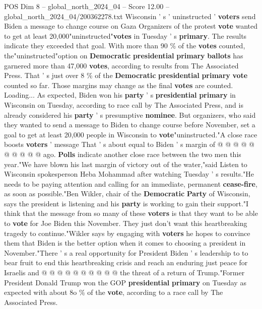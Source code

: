 \begin{textsample}{POS Dim 8 – global\_north\_2024\_04 – Score 12.00 – global\_north\_2024\_04/200362278.txt}  \label{ex:f8_pos_057}
Wisconsin ' s ' uninstructed ' \textbf{voters} send Biden a message to change course on Gaza Organizers of the protest \textbf{vote} wanted to get at least 20,000"uninstructed"\textbf{votes} in Tuesday ' s \textbf{primary}.
The results indicate they exceeded that goal.
With more than 90 \% of the \textbf{votes} counted, the"uninstructed"option on \textbf{Democratic} \textbf{presidential} \textbf{primary} \textbf{ballots} has garnered more than 47,000 \textbf{votes}, according to results from The Associated Press.
That ' s just over 8 \% of the \textbf{Democratic} \textbf{presidential} \textbf{primary} \textbf{vote} counted so far.
Those margins may change as the final \textbf{votes} are counted.
Loading...
As expected, Biden won his \textbf{party} ' s \textbf{presidential} \textbf{primary} in Wisconsin on Tuesday, according to race call by The Associated Press, and is already considered his \textbf{party} ' s presumptive \textbf{nominee}.
But organizers, who said they wanted to send a message to Biden to change course before November, set a goal to get at least 20,000 people in Wisconsin to \textbf{vote}"uninstructed."A close race boosts \textbf{voters} ' message That ' s about equal to Biden ' s margin of @ @ @ @ @ @ @ @ @ @ ago. \textbf{Polls} indicate another close race between the two men this year."We have blown his last margin of victory out of the water,"said Listen to Wisconsin spokesperson Heba Mohammad after watching Tuesday ' s results."He needs to be paying attention and calling for an immediate, permanent \textbf{cease-fire}, as soon as possible."Ben Wikler, chair of the \textbf{Democratic} \textbf{Party} of Wisconsin, says the president is listening and his \textbf{party} is working to gain their support."I think that the message from so many of these \textbf{voters} is that they want to be able to \textbf{vote} for Joe Biden this November.
They just don't want this heartbreaking tragedy to continue."Wikler says by engaging with \textbf{voters} he hopes to convince them that Biden is the better option when it comes to choosing a president in November."There ' s a real opportunity for President Biden ' s leadership to to bear fruit to end this heartbreaking crisis and reach an enduring just peace for Israelis and @ @ @ @ @ @ @ @ @ @ the threat of a return of Trump."Former President Donald Trump won the GOP \textbf{presidential} \textbf{primary} on Tuesday as expected with about 8o \% of the \textbf{vote}, according to a race call by The Associated Press.

\end{textsample}

